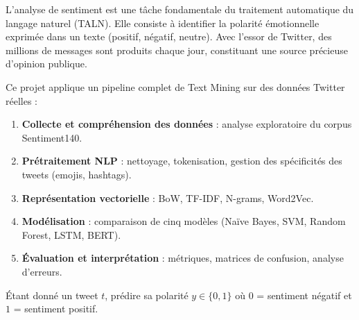 L'analyse de sentiment est une tâche fondamentale du traitement automatique du langage naturel (TALN).
Elle consiste à identifier la polarité émotionnelle exprimée dans un texte (positif, négatif, neutre).
Avec l'essor de Twitter, des millions de messages sont produits chaque jour, constituant une source
précieuse d'opinion publique.

Ce projet applique un pipeline complet de Text Mining sur des données Twitter réelles :

\begin{enumerate}[leftmargin=*,label=\arabic*.]
  \item \textbf{Collecte et compréhension des données} : analyse exploratoire du corpus Sentiment140.
  \item \textbf{Prétraitement NLP} : nettoyage, tokenisation, gestion des spécificités des tweets (emojis, hashtags).
  \item \textbf{Représentation vectorielle} : BoW, TF-IDF, N-grams, Word2Vec.
  \item \textbf{Modélisation} : comparaison de cinq modèles (Naïve Bayes, SVM, Random Forest, LSTM, BERT).
  \item \textbf{Évaluation et interprétation} : métriques, matrices de confusion, analyse d'erreurs.
\end{enumerate}

\begin{infobox}
Étant donné un tweet $t$, prédire sa polarité $y \in \{0, 1\}$ où $0$ = sentiment négatif et $1$ = sentiment positif.
\end{infobox}
